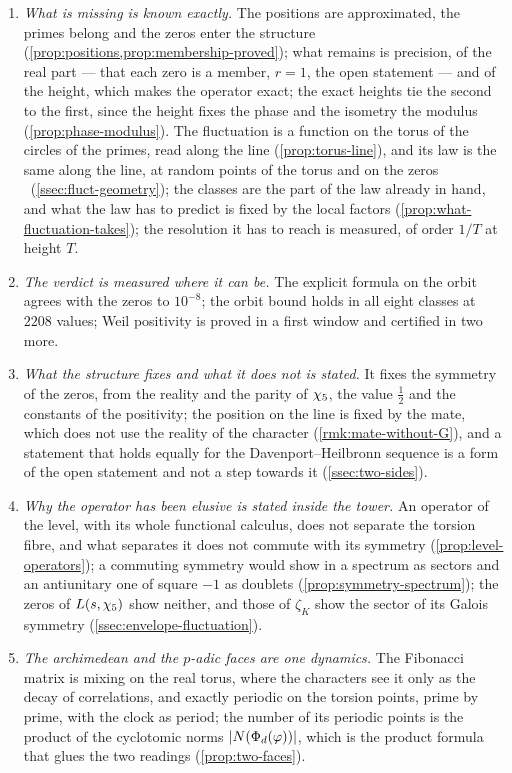 \begin{enumerate}[label=\textup{(\arabic*)}]
  \item \emph{What is missing is known exactly.}  The positions are approximated, the primes belong and
    the zeros enter the structure (\cref{prop:positions,prop:membership-proved}); what remains is precision, of the real part --- that each zero is a member, $r=1$, the open
    statement --- and of the height, which makes the operator exact; the exact heights tie the second to the first, since the height fixes the phase and the
    isometry the modulus (\cref{prop:phase-modulus}).  The fluctuation is a function on the torus of the circles of the primes, read along the line (\cref{prop:torus-line}), and its law is the same along the line, at random points of the torus and on the zeros \ (\cref{ssec:fluct-geometry});
    the classes are the part of the law already in hand, and what the law has to predict is
    fixed by the local factors (\cref{prop:what-fluctuation-takes}); the resolution it has to reach is measured, of
    order $1/T$ at height $T$.
  \item \emph{The verdict is measured where it can be.}  The explicit formula on the orbit
    agrees with the zeros to $10^{-8}$; the orbit bound holds in all eight classes at
    $2208$ values; Weil positivity is proved in a first window and certified in two more.
  \item \emph{What the structure fixes and what it does not is stated.}  It fixes the symmetry of the zeros, from the
    reality and the parity of $\chi_5$, the value $\tfrac12$ and the constants of the positivity; the position on the
    line is fixed by the mate, which does not use the reality of the character (\cref{rmk:mate-without-G}), and a
    statement that holds equally for the Davenport--Heilbronn sequence is a form of the open statement and not a step
    towards it (\cref{ssec:two-sides}).
  \item \emph{Why the operator has been elusive is stated inside the tower.}  An operator of the level, with its
    whole functional calculus, does not separate the torsion fibre, and what separates it does not commute with its
    symmetry (\cref{prop:level-operators}); a commuting symmetry would show in a spectrum as sectors and an
    antiunitary one of square $-1$ as doublets (\cref{prop:symmetry-spectrum}); the zeros of $L(s,\chi_5)$ show
    neither, and those of $\zeta_K$ show the sector of its Galois symmetry (\cref{ssec:envelope-fluctuation}).
  \item \emph{The archimedean and the $p$-adic faces are one dynamics.}  The Fibonacci matrix is mixing on the real
    torus, where the characters see it only as the decay of correlations, and exactly periodic on the torsion
    points, prime by prime, with the clock as period; the number of its periodic points is the product of the
    cyclotomic norms $|N(\Phi_d(\varphi))|$, which is the product formula that glues the two readings
    (\cref{prop:two-faces}).
\end{enumerate}

